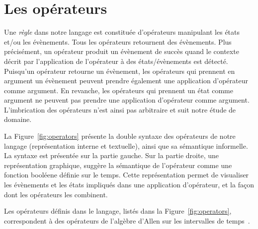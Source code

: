 \section{Les opérateurs}\label{sec:dsl:operator}
Une {\em règle} dans notre langage est constituée d'opérateurs manipulant les 
états et/ou les évènements. Tous les opérateurs retournent des évènements.
Plus précisément, un opérateur produit un évènement de succès quand le contexte 
décrit par l'application de l'opérateur à des états/évènements est détecté.
Puisqu'un opérateur retourne un évènement, les opérateurs qui prennent en argument un évènement
peuvent prendre également une application d'opérateur comme argument.
En revanche, les opérateurs qui prennent un état comme argument ne peuvent 
pas prendre une application d'opérateur comme argument.
L'imbrication des opérateurs n'est ainsi pas arbitraire et suit notre étude de domaine.

La Figure~\ref{fig:operators} présente la double syntaxe des
opérateurs de notre langage (représentation interne et textuelle),
ainsi que sa sémantique informelle.  La syntaxe est présentée sur la
partie gauche. Sur la partie droite, une représentation graphique,
suggère la sémantique de l'opérateur comme une fonction booléene
définie sur le temps.  Cette représentation permet de visualiser les
évènements et les états impliqués dans une application d'opérateur, et
la façon dont les opérateurs les combinent.
 
Les opérateurs définis dans le langage, listés dans la Figure~\ref{fig:operators}, 
correspondent à des opérateurs de l'algèbre d'Allen sur les intervalles de temps~.

